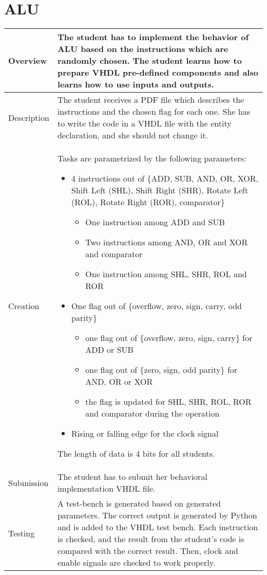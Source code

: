 \section{ALU} \label{alu}
    \begin{tabular}{|p{2cm}|p{11cm}|}
        \hline
        Overview & The student has to implement the behavior of ALU based on the instructions which are randomly chosen. 
        The student learns how to prepare VHDL pre-defined components and also learns how to use inputs and outputs.
        \\
        \hline
        Description & The student receives a PDF file which describes the instructions and the chosen flag for each one. 
        She has to write the code in a VHDL file with the entity declaration, and she should not change it. 
        \\
        \hline
        Creation & Tasks are parametrized by the following parameters:
		\begin{itemize}
			\item 4 instructions out of \{ADD, SUB, AND, OR, XOR, Shift Left (SHL), Shift Right (SHR), Rotate Left (ROL), Rotate Right (ROR), comparator\}
			\begin{itemize}
				\item One instruction among ADD and SUB
				\item Two instructions among AND, OR and XOR and comparator
				\item One instruction among SHL, SHR, ROL and ROR 
			\end{itemize}   
			\item One flag out of \{overflow, zero, sign, carry, odd parity\}
			\begin{itemize}
				\item one flag out of \{overflow, zero, sign, carry\} for ADD or SUB
				\item one flag out of \{zero, sign, odd parity\} for AND, OR or XOR
				\item the flag is updated for SHL, SHR, ROL, ROR and comparator during the operation
			\end{itemize} 
			\item Rising or falling edge for the clock signal
		\end{itemize}  
	The length of data is 4 bits for all students.
        \\
        \hline
        Submission & The student has to submit her behavioral implementation VHDL file.
        \\
        \hline
        Testing & A test-bench is generated based on generated parameters. The correct output is generated by Python and is 
        added to the VHDL test bench. Each instruction is checked, and the result from the student's code is compared with 
        the correct result. Then, clock and enable signals are checked to work properly.
        \\
        \hline
    \end{tabular}
